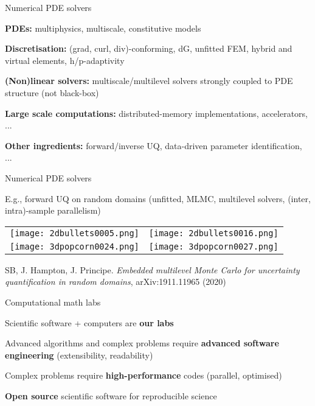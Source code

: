 
\begin{frame}{Numerical PDE solvers}

{\textbf{PDEs:}} multiphysics, multiscale, constitutive models

{\textbf{Discretisation:}} (grad, curl, div)-conforming, dG, unfitted FEM, hybrid and virtual elements, h/p-adaptivity

{\textbf{(Non)linear solvers:}} multiscale/multilevel solvers strongly coupled to PDE structure (not black-box)

{\textbf{Large scale computations:}} distributed-memory implementations, accelerators, ...

{\textbf{Other ingredients:}} forward/inverse UQ, data-driven parameter identification, ...

\end{frame}

\begin{frame}{Numerical PDE solvers}

E.g., forward UQ on random domains (unfitted, MLMC, multilevel solvers, (inter, intra)-sample parallelism)

\begin{tabular}{cc}
  \texttt{[image: 2dbullets0005.png]} &
  \texttt{[image: 2dbullets0016.png]}  \\
  \texttt{[image: 3dpopcorn0024.png]} &
  \texttt{[image: 3dpopcorn0027.png]}
\end{tabular}

{\scriptsize

SB, J. Hampton, J. Principe. \emph{Embedded multilevel Monte Carlo for uncertainty quantification in random domains}, arXiv:1911.11965 (2020) }

\end{frame}

\begin{frame}{Computational math labs}

Scientific software + computers are \textbf{our labs}


Advanced algorithms and complex problems require \textbf{advanced software engineering} (extensibility, readability)

Complex problems require \textbf{high-performance} codes (parallel, optimised)

\textbf{Open source} scientific software for reproducible science

\end{frame}

